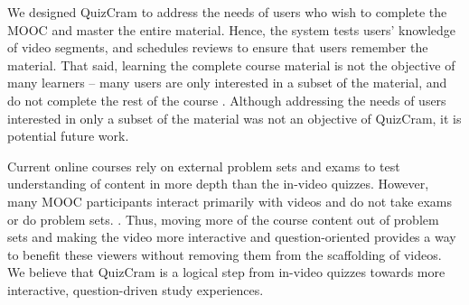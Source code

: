 \documentclass{sigchi}
\begin{document}
We designed QuizCram to address the needs of users who wish to complete the MOOC and master the entire material. Hence, the system tests users' knowledge of video segments, and schedules reviews to ensure that users remember the material. That said, learning the complete course material is not the objective of many learners  -- many users are only interested in a subset of the material, and do not complete the rest of the course \cite{deconstructing} \cite{anderson2014engaging}. Although addressing the needs of users interested in only a subset of the material was not an objective of QuizCram, it is potential future work. %

Current online courses rely on external problem sets and exams to test understanding of content in more depth than the in-video quizzes. However, many MOOC participants interact primarily with videos and do not take exams or do problem sets. \cite{anderson2014engaging} \cite{deconstructing}. Thus, moving more of the course content out of problem sets and making the video more interactive and question-oriented provides a way to benefit these viewers without removing them from the scaffolding of videos. We believe that QuizCram is a logical step from in-video quizzes towards more interactive, question-driven study experiences.

\end{document}

